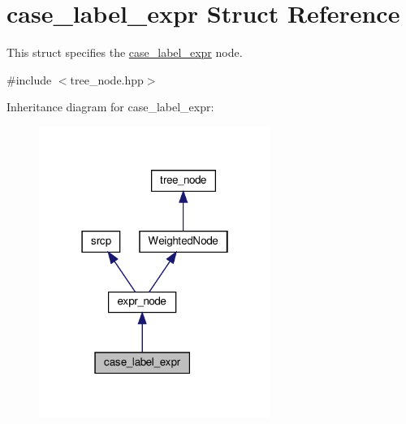 \hypertarget{structcase__label__expr}{}\section{case\+\_\+label\+\_\+expr Struct Reference}
\label{structcase__label__expr}


This struct specifies the \hyperlink{structcase__label__expr}{case\+\_\+label\+\_\+expr} node.  




{\ttfamily \#include $<$tree\+\_\+node.\+hpp$>$}



Inheritance diagram for case\+\_\+label\+\_\+expr\+:
\nopagebreak
\begin{figure}[H]
\begin{center}
\leavevmode
\includegraphics[width=214pt]{d7/dd7/structcase__label__expr__inherit__graph}
\end{center}
\end{figure}


